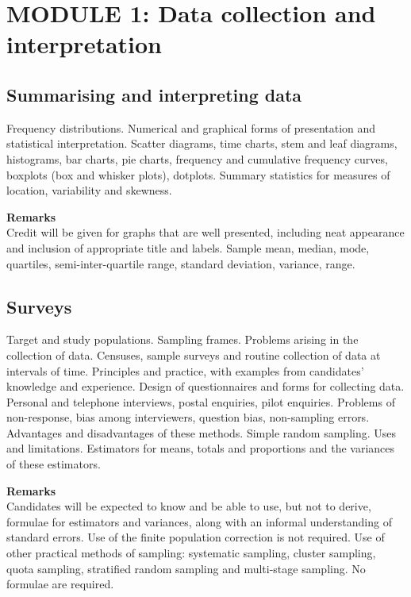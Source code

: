 \section*{MODULE 1: Data collection and interpretation}
\subsection*{Summarising and interpreting data}
Frequency distributions. Numerical and graphical forms of presentation and statistical interpretation.
Scatter diagrams, time charts, stem and leaf diagrams, histograms, bar charts, pie charts, frequency and cumulative frequency curves, boxplots (box and whisker plots), dotplots.
Summary statistics for measures of location, variability and skewness.

\textbf{Remarks}\\
Credit will be given for graphs that are well presented, including neat appearance and inclusion of appropriate title and labels.
Sample mean, median, mode, quartiles, semi-inter-quartile range, standard deviation, variance, range.
\subsection*{Surveys}
Target and study populations. Sampling frames. Problems arising in the collection of data.
Censuses, sample surveys and routine collection of data at intervals of time.
Principles and practice, with examples from candidates' knowledge and experience.
Design of questionnaires and forms for collecting data.
Personal and telephone interviews, postal enquiries, pilot enquiries.
Problems of non-response, bias among interviewers, question bias, non-sampling errors.
Advantages and disadvantages of these methods.
Simple random sampling. Uses and limitations. Estimators for means, totals and proportions and the variances of these estimators.

\textbf{Remarks}\\
Candidates will be expected to know and be able to use, but not to derive, formulae for estimators and variances, along with an informal understanding of standard errors. Use of the finite population correction is not required.
Use of other practical methods of sampling: systematic sampling, cluster sampling, quota sampling, stratified random sampling and multi-stage sampling.
No formulae are required.
